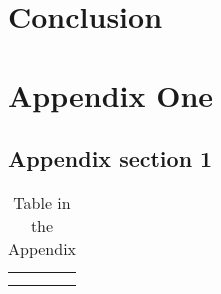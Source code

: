 \documentclass[11pt]{book}
\begin{document}
\chapter{Conclusion}


\balance



\newpage
\newcommand{\beginsupplement}{%
    \setcounter{chapter}{0}
    \renewcommand{\thechapter}{\Alph{chapter}}%
 }

\beginsupplement
\chapter{Appendix One}
\section{Appendix section 1}
\begin{table}[]
    \centering
    \begin{tabular}{c|c}
         &  \\
         & 
    \end{tabular}
    \caption{Table in the Appendix}
    \label{tab:my_label}
\end{table}
\end{document}
